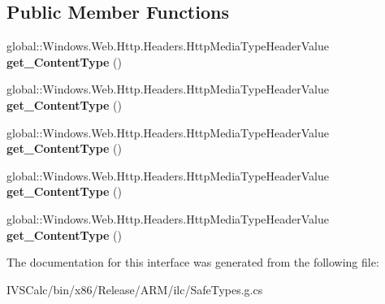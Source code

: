 \subsection*{Public Member Functions}
\begin{DoxyCompactItemize}
\item 
\mbox{\label{interface_windows_1_1_web_1_1_http_1_1_headers_1_1_i_http_content_header_collection_a7cf359d3486df03d617854430dd6e0d9}} 
global\+::\+Windows.\+Web.\+Http.\+Headers.\+Http\+Media\+Type\+Header\+Value {\bfseries get\+\_\+\+Content\+Type} ()
\item 
\mbox{\label{interface_windows_1_1_web_1_1_http_1_1_headers_1_1_i_http_content_header_collection_a7cf359d3486df03d617854430dd6e0d9}} 
global\+::\+Windows.\+Web.\+Http.\+Headers.\+Http\+Media\+Type\+Header\+Value {\bfseries get\+\_\+\+Content\+Type} ()
\item 
\mbox{\label{interface_windows_1_1_web_1_1_http_1_1_headers_1_1_i_http_content_header_collection_a7cf359d3486df03d617854430dd6e0d9}} 
global\+::\+Windows.\+Web.\+Http.\+Headers.\+Http\+Media\+Type\+Header\+Value {\bfseries get\+\_\+\+Content\+Type} ()
\item 
\mbox{\label{interface_windows_1_1_web_1_1_http_1_1_headers_1_1_i_http_content_header_collection_a7cf359d3486df03d617854430dd6e0d9}} 
global\+::\+Windows.\+Web.\+Http.\+Headers.\+Http\+Media\+Type\+Header\+Value {\bfseries get\+\_\+\+Content\+Type} ()
\item 
\mbox{\label{interface_windows_1_1_web_1_1_http_1_1_headers_1_1_i_http_content_header_collection_a7cf359d3486df03d617854430dd6e0d9}} 
global\+::\+Windows.\+Web.\+Http.\+Headers.\+Http\+Media\+Type\+Header\+Value {\bfseries get\+\_\+\+Content\+Type} ()
\end{DoxyCompactItemize}


The documentation for this interface was generated from the following file\+:\begin{DoxyCompactItemize}
\item 
I\+V\+S\+Calc/bin/x86/\+Release/\+A\+R\+M/ilc/Safe\+Types.\+g.\+cs\end{DoxyCompactItemize}
